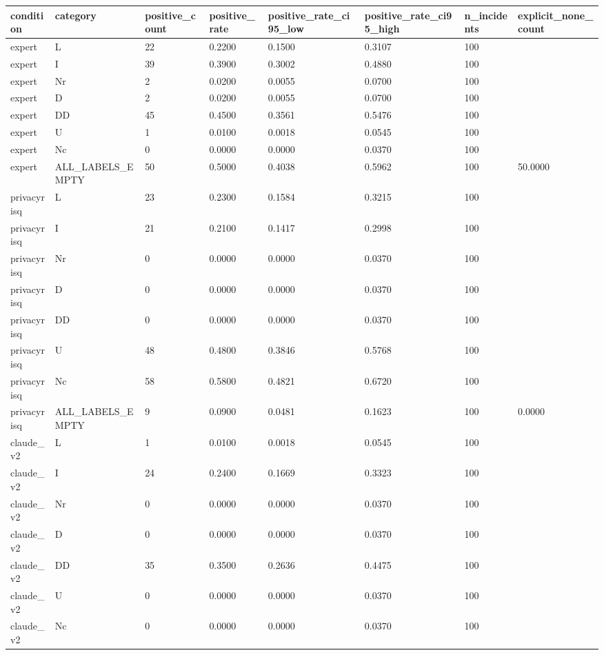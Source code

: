 \begin{table}[ht]
\centering
\begin{tabular}{llllllll}
\toprule
condition & category & positive\_count & positive\_rate & positive\_rate\_ci95\_low & positive\_rate\_ci95\_high & n\_incidents & explicit\_none\_count \\
\midrule
expert & L & 22 & 0.2200 & 0.1500 & 0.3107 & 100 &  \\
expert & I & 39 & 0.3900 & 0.3002 & 0.4880 & 100 &  \\
expert & Nr & 2 & 0.0200 & 0.0055 & 0.0700 & 100 &  \\
expert & D & 2 & 0.0200 & 0.0055 & 0.0700 & 100 &  \\
expert & DD & 45 & 0.4500 & 0.3561 & 0.5476 & 100 &  \\
expert & U & 1 & 0.0100 & 0.0018 & 0.0545 & 100 &  \\
expert & Nc & 0 & 0.0000 & 0.0000 & 0.0370 & 100 &  \\
expert & ALL\_LABELS\_EMPTY & 50 & 0.5000 & 0.4038 & 0.5962 & 100 & 50.0000 \\
privacyrisq & L & 23 & 0.2300 & 0.1584 & 0.3215 & 100 &  \\
privacyrisq & I & 21 & 0.2100 & 0.1417 & 0.2998 & 100 &  \\
privacyrisq & Nr & 0 & 0.0000 & 0.0000 & 0.0370 & 100 &  \\
privacyrisq & D & 0 & 0.0000 & 0.0000 & 0.0370 & 100 &  \\
privacyrisq & DD & 0 & 0.0000 & 0.0000 & 0.0370 & 100 &  \\
privacyrisq & U & 48 & 0.4800 & 0.3846 & 0.5768 & 100 &  \\
privacyrisq & Nc & 58 & 0.5800 & 0.4821 & 0.6720 & 100 &  \\
privacyrisq & ALL\_LABELS\_EMPTY & 9 & 0.0900 & 0.0481 & 0.1623 & 100 & 0.0000 \\
claude\_v2 & L & 1 & 0.0100 & 0.0018 & 0.0545 & 100 &  \\
claude\_v2 & I & 24 & 0.2400 & 0.1669 & 0.3323 & 100 &  \\
claude\_v2 & Nr & 0 & 0.0000 & 0.0000 & 0.0370 & 100 &  \\
claude\_v2 & D & 0 & 0.0000 & 0.0000 & 0.0370 & 100 &  \\
claude\_v2 & DD & 35 & 0.3500 & 0.2636 & 0.4475 & 100 &  \\
claude\_v2 & U & 0 & 0.0000 & 0.0000 & 0.0370 & 100 &  \\
claude\_v2 & Nc & 0 & 0.0000 & 0.0000 & 0.0370 & 100 &  \\

\end{tabular}
\end{table}
